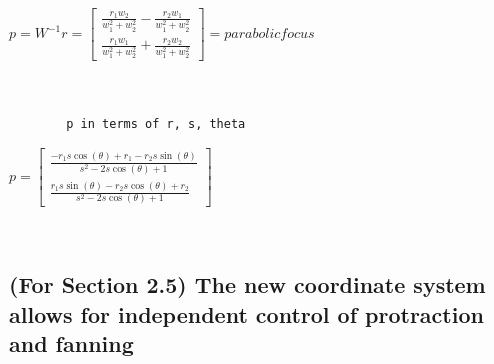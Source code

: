 \documentclass[11pt]{article}
\begin{document}
            $\displaystyle p = W^{-1}r = \left[\begin{matrix}\frac{r_{1} w_{2}}{w_{1}^{2} + w_{2}^{2}} - \frac{r_{2} w_{1}}{w_{1}^{2} + w_{2}^{2}}\\\frac{r_{1} w_{1}}{w_{1}^{2} + w_{2}^{2}} + \frac{r_{2} w_{2}}{w_{1}^{2} + w_{2}^{2}}\end{matrix}\right] = parabolicfocus$

            
            \begin{Verbatim}[commandchars=\\\{\}]


        p in terms of r, s, theta
            \end{Verbatim}

            $\displaystyle p = \left[\begin{matrix}\frac{- r_{1} s \cos{\left(\theta \right)} + r_{1} - r_{2} s \sin{\left(\theta \right)}}{s^{2} - 2 s \cos{\left(\theta \right)} + 1}\\\frac{r_{1} s \sin{\left(\theta \right)} - r_{2} s \cos{\left(\theta \right)} + r_{2}}{s^{2} - 2 s \cos{\left(\theta \right)} + 1}\end{matrix}\right]$

            
            \begin{Verbatim}[commandchars=\\\{\}]


            \end{Verbatim}

    \subsection{(For Section 2.5) The new coordinate system allows for independent control of protraction and fanning}\label{the-new-coordinate-system-allows-for-independent-control-of-protraction-and-fanning}
\end{document}
